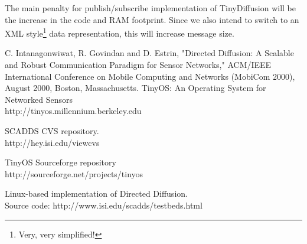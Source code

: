 \documentclass[11pt,onecolumn]{article}
\begin{document}
The main penalty for publish/subscribe implementation of TinyDiffusion
will be the increase in the code and RAM footprint. Since we also intend
to switch to an XML style\footnote{Very, very simplified!} data
representation, this will increase message size.


\begin{thebibliography}{9}
    C. Intanagonwiwat, R. Govindan and D. Estrin, "Directed Diffusion:
    A Scalable and Robust Communication Paradigm for Sensor
    Networks," ACM/IEEE International Conference on Mobile Computing
    and Networks (MobiCom 2000), August 2000, Boston, Massachusetts.
	TinyOS: An Operating System for Networked Sensors\\
	http://tinyos.millennium.berkeley.edu

    SCADDS CVS repository.\\
    http://hey.isi.edu/viewcvs

    TinyOS Sourceforge repository\\
    http://sourceforge.net/projects/tinyos	

    Linux-based implementation of Directed Diffusion.\\
    Source code: http://www.isi.edu/scadds/testbeds.html

\end{thebibliography}


	
\end{document}
